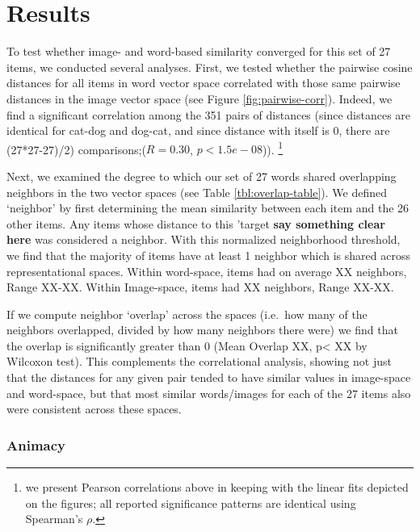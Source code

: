 \documentclass[10pt, letterpaper]{article}
\begin{document}
\section{Results}\label{results}

To test whether image- and word-based similarity converged for this set
of 27 items, we conducted several analyses. First, we tested whether the
pairwise cosine distances for all items in word vector space correlated
with those same pairwise distances in the image vector space (see Figure
\ref{fig:pairwise-corr}). Indeed, we find a significant correlation
among the 351 pairs of distances (since distances are identical for
cat-dog and dog-cat, and since distance with itself is 0, there are
(27*27-27)/2) comparisons;(\(R = 0.30\), \(p < 1.5e-08\))).
\footnote{we present Pearson correlations above in keeping with the linear fits depicted on the figures; all reported significance patterns are identical using Spearman's $\rho$.}

Next, we examined the degree to which our set of 27 words shared
overlapping neighbors in the two vector spaces (see Table
\ref{tbl:overlap-table}). We defined `neighbor' by first determining the
mean similarity between each item and the 26 other items. Any items
whose distance to this 'target \textbf{say something clear here} was
considered a neighbor. With this normalized neighborhood threshold, we
find that the majority of items have at least 1 neighbor which is shared
across representational spaces. Within word-space, items had on average
XX neighbors, Range XX-XX. Within Image-space, items had XX neighbors,
Range XX-XX.

If we compute neighbor `overlap' across the spaces (i.e.~how many of the
neighbors overlapped, divided by how many neighbors there were) we find
that the overlap is significantly greater than 0 (Mean Overlap XX,
p\textless{} XX by Wilcoxon test). This complements the correlational
analysis, showing not just that the distances for any given pair tended
to have similar values in image-space and word-space, but that most
similar words/images for each of the 27 items also were consistent
across these spaces.

\subsubsection{Animacy}\label{animacy}
\end{document}

